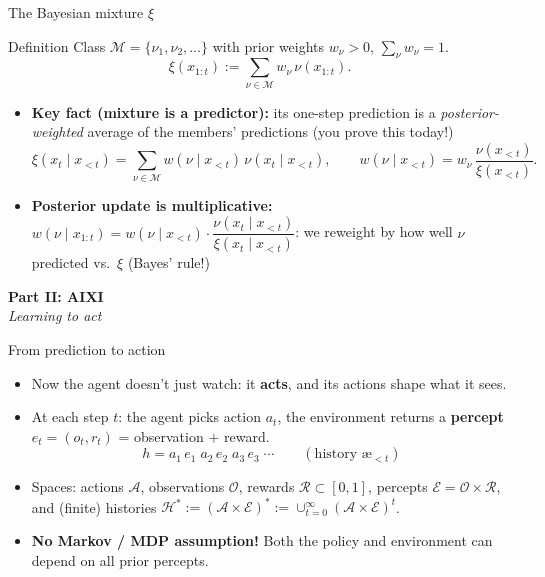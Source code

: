 \documentclass[10pt,aspectratio=169]{beamer}
\newcommand{\cA}{\mathcal{A}}
\newcommand{\cO}{\mathcal{O}}
\newcommand{\cR}{\mathcal{R}}
\newcommand{\cE}{\mathcal{E}}
\newcommand{\cH}{\mathcal{H}}
\newcommand{\cM}{\mathcal{M}}
\newcommand{\aes}{{\text{\ae}}}            %
\begin{document}
\begin{frame}{The Bayesian mixture $\xi$}
\begin{block}{Definition}
Class $\cM=\{\nu_1,\nu_2,\dots\}$ with prior weights $w_\nu>0$, $\sum_\nu w_\nu = 1$.
\[
\xi(x_{1:t}) := \sum_{\nu \in \cM} w_\nu\, \nu(x_{1:t}).
\]
\end{block}
\pause
\begin{itemize}
    \item \textbf{Key fact (mixture is a predictor):} its one-step prediction is a
    \emph{posterior-weighted} average of the members' predictions (you prove this today!)
    \[
    \xi(x_t \mid x_{<t}) = \sum_{\nu \in \cM} w(\nu \mid x_{<t})\, \nu(x_t \mid x_{<t}),
    \qquad
    w(\nu \mid x_{<t}) = w_\nu\,\frac{\nu(x_{<t})}{\xi(x_{<t})}.
    \]
    \pause
    \item \textbf{Posterior update is multiplicative:}
    $w(\nu \mid x_{1:t}) = w(\nu\mid x_{<t})\cdot \dfrac{\nu(x_t\mid x_{<t})}{\xi(x_t\mid x_{<t})}$: we
    reweight by how well $\nu$ predicted vs.\ $\xi$ (Bayes' rule!)
\end{itemize}
\end{frame}

\begin{frame}
\begin{center}
{\Huge \textbf{Part II: AIXI}}\\[1em]
{\large \emph{Learning to act}}\\[2em]
\end{center}
\end{frame}

\begin{frame}{From prediction to action}
\begin{itemize}
    \item Now the agent doesn't just watch: it \textbf{acts}, and its actions shape what it sees.
    \pause
    \item At each step $t$: the agent picks action $a_t$, the environment returns a
    \textbf{percept} $e_t=(o_t,r_t)$ = observation $+$ reward.
    \[
    h = a_1\, e_1 \; a_2\, e_2 \; a_3\, e_3 \;\cdots \qquad
    (\text{history } \aes_{<t})
    \]
    \pause
    \item Spaces: actions $\cA$, observations $\cO$, rewards $\cR \subset [0,1]$, percepts $\cE=\cO\times\cR$,
    and (finite) histories $\cH^* := (\cA \times \cE)^* := \cup_{t=0}^\infty (\cA \times \cE)^t$.
    \pause
    \item \textbf{No Markov / MDP assumption!} Both the policy and environment can depend on all prior percepts.
\end{itemize}
\end{frame}
\end{document}
